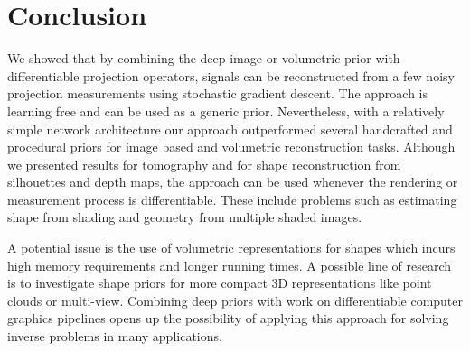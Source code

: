 \section{Conclusion}

We showed that by combining the deep image or volumetric prior with differentiable projection operators, signals can be reconstructed from a few noisy projection measurements using stochastic gradient descent.
The approach is learning free and can be used as a generic prior.
Nevertheless, with a relatively simple network architecture our approach outperformed several handcrafted and procedural priors for image based and volumetric reconstruction tasks.
Although we presented results for tomography and for shape reconstruction from silhouettes and depth maps, the approach can be used whenever the rendering or measurement process is differentiable.
These include problems such as estimating shape from shading and geometry from multiple shaded images.

A potential issue is the use of volumetric representations for shapes which
incurs high memory requirements and longer running times.
A possible line of research is to investigate shape priors for
more compact 3D representations like point clouds or multi-view.
Combining deep priors with work on differentiable computer graphics
pipelines opens up the possibility of applying this approach for
solving inverse problems in many applications.

